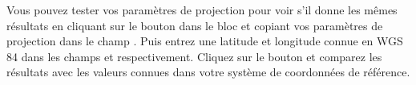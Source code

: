 Vous pouvez tester vos param\`etres de projection pour voir s'il donne les m\^emes
r\'esultats en cliquant sur le bouton  dans le bloc 
 et copiant vos param\`etres de projection dans le champ
. Puis entrez une latitude et longitude connue en WGS 84
dans les champs  et  respectivement. Cliquez sur
le bouton  et comparez les r\'esultats avec les valeurs connues
dans votre syst\`eme de coordonn\'ees de r\'ef\'erence.


